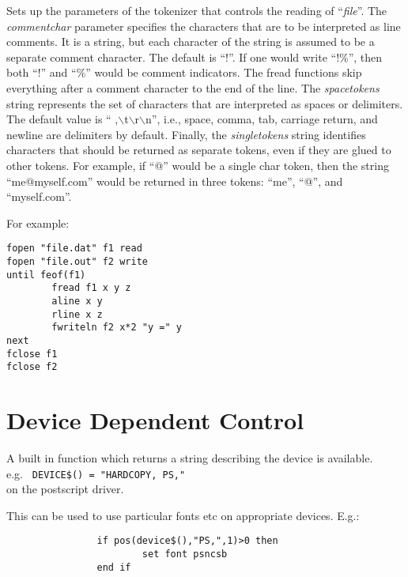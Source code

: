 \begin{commanddescription}
Sets up the parameters of the tokenizer that controls the reading of ``{\it file}''. The {\it commentchar} parameter specifies the characters that are to be interpreted as line comments. It is a string, but each character of the string is assumed to be a separate comment character. The default is ``!''. If one would write ``!\%'', then both ``!'' and ``\%'' would be comment indicators. The {\sf fread} functions skip everything after a comment character to the end of the line. The {\it spacetokens} string represents the set of characters that are interpreted as spaces or delimiters. The default value is `` ,$\backslash$t$\backslash$r$\backslash$n'', i.e., space, comma, tab, carriage return, and newline are delimiters by default. Finally, the {\it singletokens} string identifies characters that should be returned as separate tokens, even if they are glued to other tokens. For example, if ``@'' would be a single char token, then the string ``me@myself.com'' would be returned in three tokens: ``me'', ``@'', and ``myself.com''. 

\end{commanddescription}

For example:

\preglecode{}
\begin{Verbatim}
fopen "file.dat" f1 read
fopen "file.out" f2 write
until feof(f1)
        fread f1 x y z
        aline x y
        rline x z
        fwriteln f2 x*2 "y =" y
next
fclose f1
fclose f2
\end{Verbatim}
\postglecode{}

\section{Device Dependent Control}
A built in function which returns a string describing 
the device is available. \\e.g. \verb# DEVICE$() = "HARDCOPY, PS,"#\\
on the postscript driver.

This can be used to use particular fonts etc on appropriate
devices. E.g.:

\preglecode{}
\begin{Verbatim}
                if pos(device$(),"PS,",1)>0 then
                        set font psncsb
                end if 
\end{Verbatim}
\postglecode{}
